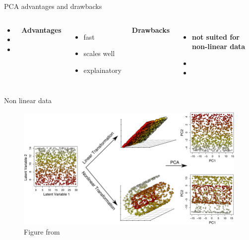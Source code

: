 \documentclass{irdbeamer}
\let\oldcite=\cite
\renewcommand{\cite}[1]{\textcolor[rgb]{.5,.5,.7}{\oldcite{#1}}}
\begin{document}





\begin{frame}{PCA advantages and drawbacks}
\begin{columns}
\begin{column}{0.05\textwidth}
\begin{itemize}
    \item[] 
    \item[] 
    \item[] 
\end{itemize}
\end{column}
        \textbf{Advantages}
        \begin{itemize}
            \item<1-> fast
            \item<2-> scales well
            \item<3-> explainatory
        \end{itemize}
        \textbf{Drawbacks}
        \begin{itemize}
            \item<4-> \textbf{not suited for non-linear data}
            \item[] 
            \item[] 
        \end{itemize}
\end{columns}
\end{frame}

\begin{frame}{Non linear data}
    \begin{figure}
    \centering
    \includegraphics[width=.7\textwidth]{./figs/non_linearity.png}
    \caption{\tiny Figure from \cite{du2019dimensionality}}
    \end{figure}
\end{frame}
\end{document}
